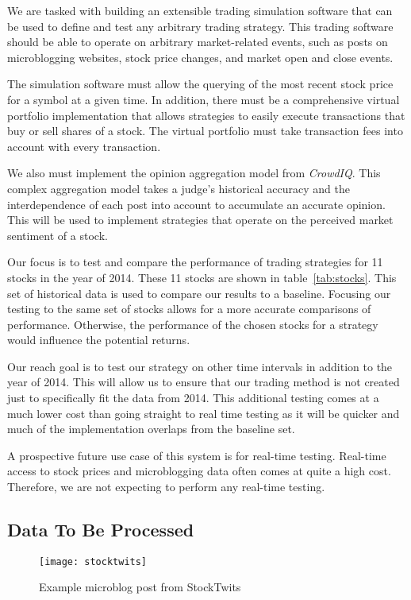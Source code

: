 We are tasked with building an extensible trading simulation software that can be used to define and test any arbitrary trading strategy. This trading software should be able to operate on arbitrary market-related events, such as posts on microblogging websites, stock price changes, and market open and close events.

The simulation software must allow the querying of the most recent stock price for a symbol at a given time. In addition, there must be a comprehensive virtual portfolio implementation that allows strategies to easily execute transactions that buy or sell shares of a stock. The virtual portfolio must take transaction fees into account with every transaction.

We also must implement the opinion aggregation model from \textit{CrowdIQ}. This complex aggregation model takes a judge's historical accuracy and the interdependence of each post into account to accumulate an accurate opinion. This will be used to implement strategies that operate on the perceived market sentiment of a stock.

Our focus is to test and compare the performance of trading strategies for 11 stocks in the year of 2014. These 11 stocks are shown in table~\ref{tab:stocks}. This set of historical data is used to compare our results to a baseline. Focusing our testing to the same set of stocks allows for a more accurate comparisons of performance. Otherwise, the performance of the chosen stocks for a strategy would influence the potential returns.

Our reach goal is to test our strategy on other time intervals in addition to the year of 2014. This will allow us to ensure that our trading method is not created just to specifically fit the data from 2014. This additional testing comes at a much lower cost than going straight to real time testing as it will be quicker and much of the implementation overlaps from the baseline set. 

A prospective future use case of this system is for real-time testing. Real-time access to stock prices and microblogging data often comes at quite a high cost. Therefore, we are not expecting to perform any real-time testing.

\subsection{Data To Be Processed}

\begin{figure}
  \centering
  \texttt{[image: stocktwits]}
  \caption{Example microblog post from StockTwits}\label{fig:stocktwits}
\end{figure}

